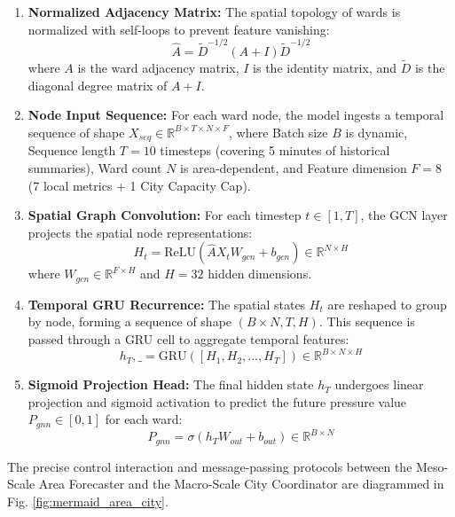 \documentclass[conference]{IEEEtran}
\begin{document}
\begin{enumerate}
    \item \textbf{Normalized Adjacency Matrix:} The spatial topology of wards is normalized with self-loops to prevent feature vanishing:
    \begin{equation}
    \hat{A} = \tilde{D}^{-1/2} (A + I) \tilde{D}^{-1/2}
    \end{equation}
    where $A$ is the ward adjacency matrix, $I$ is the identity matrix, and $\tilde{D}$ is the diagonal degree matrix of $A+I$.
    \item \textbf{Node Input Sequence:} For each ward node, the model ingests a temporal sequence of shape $X_{seq} \in \mathbb{R}^{B \times T \times N \times F}$, where Batch size $B$ is dynamic, Sequence length $T = 10$ timesteps (covering 5 minutes of historical summaries), Ward count $N$ is area-dependent, and Feature dimension $F = 8$ (7 local metrics + 1 City Capacity Cap).
    \item \textbf{Spatial Graph Convolution:} For each timestep $t \in [1, T]$, the GCN layer projects the spatial node representations:
    \begin{equation}
    H_t = \text{ReLU}\left( \hat{A} X_t W_{gcn} + b_{gcn} \right) \in \mathbb{R}^{N \times H}
    \end{equation}
    where $W_{gcn} \in \mathbb{R}^{F \times H}$ and $H = 32$ hidden dimensions.
    \item \textbf{Temporal GRU Recurrence:} The spatial states $H_t$ are reshaped to group by node, forming a sequence of shape $(B \times N, T, H)$. This sequence is passed through a GRU cell to aggregate temporal features:
    \begin{equation}
    h_T, \_ = \text{GRU}\left( [H_1, H_2, ..., H_T] \right) \in \mathbb{R}^{B \times N \times H}
    \end{equation}
    \item \textbf{Sigmoid Projection Head:} The final hidden state $h_T$ undergoes linear projection and sigmoid activation to predict the future pressure value $P_{gnn} \in [0, 1]$ for each ward:
    \begin{equation}
    P_{gnn} = \sigma\left( h_T W_{out} + b_{out} \right) \in \mathbb{R}^{B \times N}
    \end{equation}
\end{enumerate}

The precise control interaction and message-passing protocols between the Meso-Scale Area Forecaster and the Macro-Scale City Coordinator are diagrammed in Fig. \ref{fig:mermaid_area_city}.
\end{document}
